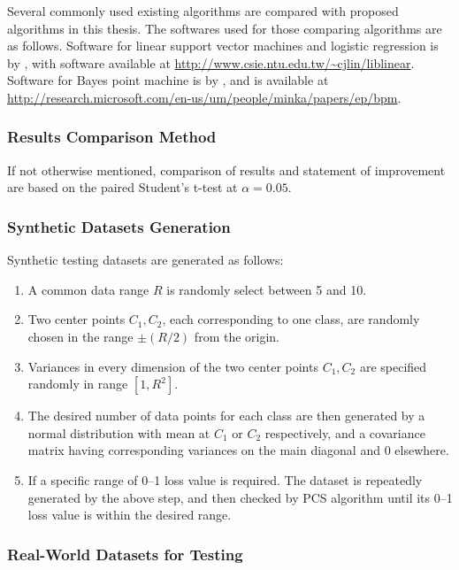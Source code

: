 Several commonly used existing algorithms are compared with proposed
algorithms in this thesis. The softwares used for those comparing
algorithms are as follows. Software for linear support vector machines
and logistic regression is by \cite{linearSVM}, with software
available at
\url{http://www.csie.ntu.edu.tw/~cjlin/liblinear}. Software for Bayes
point machine is by \cite{bpm}, and is available at
\url{http://research.microsoft.com/en-us/um/people/minka/papers/ep/bpm}.

\subsubsection{Results Comparison Method}

If not otherwise mentioned, comparison of results and statement of improvement are based on the paired Student's t-test at $\alpha = 0.05$.  

\subsubsection{Synthetic Datasets Generation}

Synthetic testing datasets are generated as follows: 
\begin{enumerate}
  \setlength{\itemsep}{4pt}
  \setlength{\parskip}{1pt}
  \setlength{\parsep}{1pt}
	\item A common data range $R$ is randomly select between 5 and 10. 
	\item Two center points $C_1, C_2$, each corresponding to one class, are randomly chosen in the range $\pm (R/2)$ from the origin. 
	\item Variances in every dimension of the two center points $C_1, C_2$ are specified randomly in range $[1, R^2]$. 
	\item The desired number of data points for each class are then generated by a normal distribution with mean at $C_1$ or $C_2$ respectively, and a covariance matrix having corresponding variances on the main diagonal and 0 elsewhere.     
	\item If a specific range of 0--1 loss value is required. The dataset is repeatedly generated by the above step, and then checked by PCS algorithm until its 0--1 loss value is within the desired range.
\end{enumerate}

\subsubsection{Real-World Datasets for Testing}

